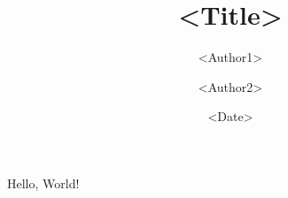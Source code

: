 \documentclass{article}
\author{<Author1>\and <Author2>}
\title{<Title>}
\date{<Date>}
\begin{document}
    \maketitle{}

    Hello, World!
\end{document}
